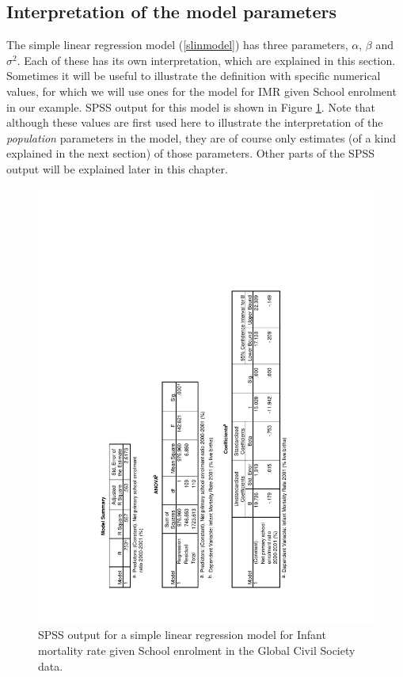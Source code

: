 \subsection{Interpretation of the model parameters}
\label{ss_regression_simple_int}

The simple linear regression model (\ref{slinmodel}) has three
parameters, $\alpha$, $\beta$ and $\sigma^{2}$. Each of these has its
own interpretation, which are explained in this section. Sometimes it
will be useful to illustrate the definition with specific numerical
values, for which we will use ones for the model for IMR
given School enrolment in our example. SPSS output for this model is
shown in Figure \ref{f_spss_linreg}. Note that although these values are
first used here to illustrate the interpretation of the \emph{population}
parameters in the model, they are of course only estimates (of a
kind explained in the next section) of those parameters. Other parts of
the SPSS output will be explained later in this chapter.

\begin{figure}[t]
\caption{SPSS output for a simple linear regression model for Infant
mortality rate given School enrolment in the Global Civil Society data.}
\label{f_spss_linreg}

\includegraphics[bb=100 90 470 590, angle=-90, width=144mm]{spsslinreg}

\end{figure}

